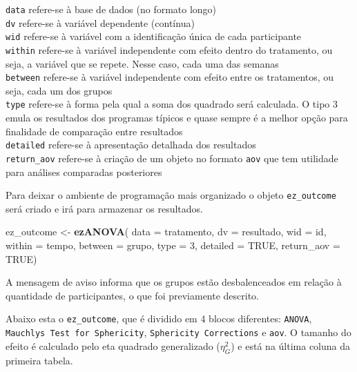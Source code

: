\documentclass[
]{book}
\newenvironment{Shaded}{\begin{snugshade}}{\end{snugshade}}
\newcommand{\DataTypeTok}[1]{\textcolor[rgb]{0.13,0.29,0.53}{#1}}
\newcommand{\DecValTok}[1]{\textcolor[rgb]{0.00,0.00,0.81}{#1}}
\newcommand{\KeywordTok}[1]{\textcolor[rgb]{0.13,0.29,0.53}{\textbf{#1}}}
\newcommand{\NormalTok}[1]{#1}
\newcommand{\OtherTok}[1]{\textcolor[rgb]{0.56,0.35,0.01}{#1}}
\newcommand{\StringTok}[1]{\textcolor[rgb]{0.31,0.60,0.02}{#1}}
\begin{document}
\texttt{data} refere-se à base de dados (no formato longo)\\
\texttt{dv} refere-se à variável dependente (contínua)\\
\texttt{wid} refere-se à variável com a identificação única de cada
participante\\
\texttt{within} refere-se à variável independente com efeito dentro do
tratamento, ou seja, a variável que se repete. Nesse caso, cada uma das
semanas\\
\texttt{between} refere-se à variável independente com efeito entre os
tratamentos, ou seja, cada um dos grupos\\
\texttt{type} refere-se à forma pela qual a soma dos quadrado será
calculada. O tipo 3 emula os resultados dos programas típicos e quase
sempre é a melhor opção para finalidade de comparação entre resultados\\
\texttt{detailed} refere-se à apresentação detalhada dos resultados\\
\texttt{return\_aov} refere-se à criação de um objeto no formato
\texttt{aov} que tem utilidade para análises comparadas posteriores

Para deixar o ambiente de programação mais organizado o objeto
\texttt{ez\_outcome} será criado e irá para armazenar os resultados.

\begin{Shaded}
\begin{Highlighting}[]
\NormalTok{ez_outcome <-}\StringTok{ }\KeywordTok{ezANOVA}\NormalTok{(}
  \DataTypeTok{data =}\NormalTok{ tratamento,}
  \DataTypeTok{dv =}\NormalTok{ resultado,}
  \DataTypeTok{wid =}\NormalTok{ id,}
  \DataTypeTok{within =}\NormalTok{ tempo,}
  \DataTypeTok{between =}\NormalTok{ grupo,}
  \DataTypeTok{type =} \DecValTok{3}\NormalTok{,}
  \DataTypeTok{detailed =} \OtherTok{TRUE}\NormalTok{,}
  \DataTypeTok{return_aov =} \OtherTok{TRUE}\NormalTok{)}
\end{Highlighting}
\end{Shaded}

A mensagem de aviso informa que os grupos estão desbalenceados em
relação à quantidade de participantes, o que foi previamente descrito.

Abaixo esta o \texttt{ez\_outcome}, que é dividido em 4 blocos
diferentes: \texttt{ANOVA},
\texttt{Mauchly\textquotesingle{}s\ Test\ for\ Sphericity},
\texttt{Sphericity\ Corrections} e \texttt{aov}. O tamanho do efeito é
calculado pelo eta quadrado generalizado (\(\eta^2_G\)) e está na última
coluna da primeira tabela.
\end{document}
